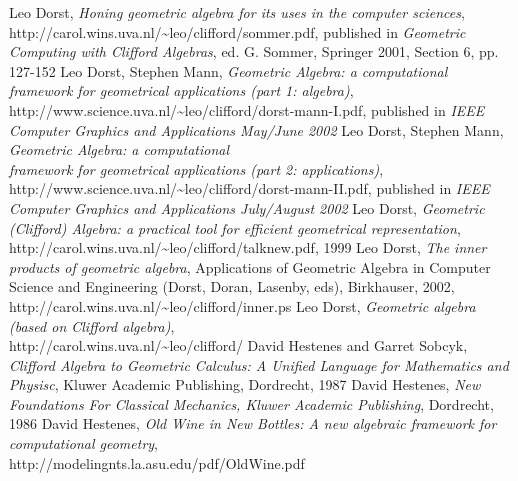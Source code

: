 \documentclass[10pt]{report}
\begin{document}
\begin{thebibliography}{99}

    Leo Dorst, \emph{Honing geometric algebra for its uses in the computer
    sciences}, http://carol.wins.uva.nl/\~{}leo/clifford/sommer.pdf,
    published in \emph{Geometric Computing with Clifford Algebras}, ed. G. Sommer,
    Springer 2001, Section 6, pp. 127-152
    Leo Dorst, Stephen Mann, \emph{Geometric Algebra: a computational \\
    framework for geometrical applications (part 1: algebra)}, \\
    http://www.science.uva.nl/\~{}leo/clifford/dorst-mann-I.pdf,
    published in \emph{IEEE Computer Graphics and Applications May/June
    2002}
    Leo Dorst, Stephen Mann, \emph{Geometric Algebra: a computational \\
    framework for geometrical applications (part 2: applications)}, \\
    http://www.science.uva.nl/\~{}leo/clifford/dorst-mann-II.pdf,
    published in \emph{IEEE Computer Graphics and Applications
    July/August 2002}
    Leo Dorst, \emph{Geometric (Clifford) Algebra: a practical tool for efficient geometrical
    representation},\\
    http://carol.wins.uva.nl/\~{}leo/clifford/talknew.pdf, 1999
    Leo Dorst, \emph{The inner products of geometric algebra}, Applications of
    Geometric Algebra in Computer Science and Engineering (Dorst,
    Doran, Lasenby, eds), Birkhauser, 2002, \\
    http://carol.wins.uva.nl/\~{}leo/clifford/inner.ps
    Leo Dorst, \emph{Geometric algebra (based on Clifford algebra)},
    \\http://carol.wins.uva.nl/\~{}leo/clifford/
    David Hestenes and Garret Sobcyk, \emph{Clifford Algebra to Geometric
    Calculus: A Unified Language for Mathematics and Physisc}, Kluwer Academic
    Publishing, Dordrecht, 1987
    David Hestenes, \emph{New Foundations For Classical Mechanics,
    Kluwer Academic Publishing}, Dordrecht, 1986
    David Hestenes, \emph{Old Wine in New Bottles: A new algebraic
    framework for computational geometry}, \\http://modelingnts.la.asu.edu/pdf/OldWine.pdf

\end{thebibliography}
\end{document}
